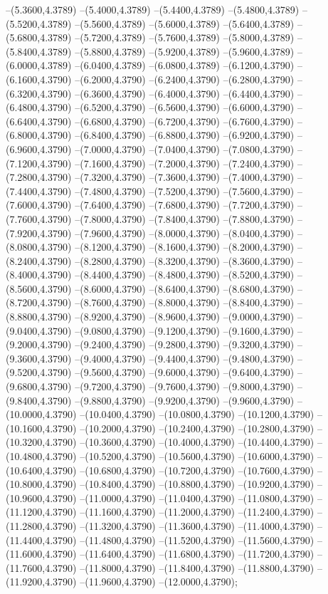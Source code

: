 {	--(5.3600,4.3789)
	--(5.4000,4.3789)
	--(5.4400,4.3789)
	--(5.4800,4.3789)
	--(5.5200,4.3789)
	--(5.5600,4.3789)
	--(5.6000,4.3789)
	--(5.6400,4.3789)
	--(5.6800,4.3789)
	--(5.7200,4.3789)
	--(5.7600,4.3789)
	--(5.8000,4.3789)
	--(5.8400,4.3789)
	--(5.8800,4.3789)
	--(5.9200,4.3789)
	--(5.9600,4.3789)
	--(6.0000,4.3789)
	--(6.0400,4.3789)
	--(6.0800,4.3789)
	--(6.1200,4.3790)
	--(6.1600,4.3790)
	--(6.2000,4.3790)
	--(6.2400,4.3790)
	--(6.2800,4.3790)
	--(6.3200,4.3790)
	--(6.3600,4.3790)
	--(6.4000,4.3790)
	--(6.4400,4.3790)
	--(6.4800,4.3790)
	--(6.5200,4.3790)
	--(6.5600,4.3790)
	--(6.6000,4.3790)
	--(6.6400,4.3790)
	--(6.6800,4.3790)
	--(6.7200,4.3790)
	--(6.7600,4.3790)
	--(6.8000,4.3790)
	--(6.8400,4.3790)
	--(6.8800,4.3790)
	--(6.9200,4.3790)
	--(6.9600,4.3790)
	--(7.0000,4.3790)
	--(7.0400,4.3790)
	--(7.0800,4.3790)
	--(7.1200,4.3790)
	--(7.1600,4.3790)
	--(7.2000,4.3790)
	--(7.2400,4.3790)
	--(7.2800,4.3790)
	--(7.3200,4.3790)
	--(7.3600,4.3790)
	--(7.4000,4.3790)
	--(7.4400,4.3790)
	--(7.4800,4.3790)
	--(7.5200,4.3790)
	--(7.5600,4.3790)
	--(7.6000,4.3790)
	--(7.6400,4.3790)
	--(7.6800,4.3790)
	--(7.7200,4.3790)
	--(7.7600,4.3790)
	--(7.8000,4.3790)
	--(7.8400,4.3790)
	--(7.8800,4.3790)
	--(7.9200,4.3790)
	--(7.9600,4.3790)
	--(8.0000,4.3790)
	--(8.0400,4.3790)
	--(8.0800,4.3790)
	--(8.1200,4.3790)
	--(8.1600,4.3790)
	--(8.2000,4.3790)
	--(8.2400,4.3790)
	--(8.2800,4.3790)
	--(8.3200,4.3790)
	--(8.3600,4.3790)
	--(8.4000,4.3790)
	--(8.4400,4.3790)
	--(8.4800,4.3790)
	--(8.5200,4.3790)
	--(8.5600,4.3790)
	--(8.6000,4.3790)
	--(8.6400,4.3790)
	--(8.6800,4.3790)
	--(8.7200,4.3790)
	--(8.7600,4.3790)
	--(8.8000,4.3790)
	--(8.8400,4.3790)
	--(8.8800,4.3790)
	--(8.9200,4.3790)
	--(8.9600,4.3790)
	--(9.0000,4.3790)
	--(9.0400,4.3790)
	--(9.0800,4.3790)
	--(9.1200,4.3790)
	--(9.1600,4.3790)
	--(9.2000,4.3790)
	--(9.2400,4.3790)
	--(9.2800,4.3790)
	--(9.3200,4.3790)
	--(9.3600,4.3790)
	--(9.4000,4.3790)
	--(9.4400,4.3790)
	--(9.4800,4.3790)
	--(9.5200,4.3790)
	--(9.5600,4.3790)
	--(9.6000,4.3790)
	--(9.6400,4.3790)
	--(9.6800,4.3790)
	--(9.7200,4.3790)
	--(9.7600,4.3790)
	--(9.8000,4.3790)
	--(9.8400,4.3790)
	--(9.8800,4.3790)
	--(9.9200,4.3790)
	--(9.9600,4.3790)
	--(10.0000,4.3790)
	--(10.0400,4.3790)
	--(10.0800,4.3790)
	--(10.1200,4.3790)
	--(10.1600,4.3790)
	--(10.2000,4.3790)
	--(10.2400,4.3790)
	--(10.2800,4.3790)
	--(10.3200,4.3790)
	--(10.3600,4.3790)
	--(10.4000,4.3790)
	--(10.4400,4.3790)
	--(10.4800,4.3790)
	--(10.5200,4.3790)
	--(10.5600,4.3790)
	--(10.6000,4.3790)
	--(10.6400,4.3790)
	--(10.6800,4.3790)
	--(10.7200,4.3790)
	--(10.7600,4.3790)
	--(10.8000,4.3790)
	--(10.8400,4.3790)
	--(10.8800,4.3790)
	--(10.9200,4.3790)
	--(10.9600,4.3790)
	--(11.0000,4.3790)
	--(11.0400,4.3790)
	--(11.0800,4.3790)
	--(11.1200,4.3790)
	--(11.1600,4.3790)
	--(11.2000,4.3790)
	--(11.2400,4.3790)
	--(11.2800,4.3790)
	--(11.3200,4.3790)
	--(11.3600,4.3790)
	--(11.4000,4.3790)
	--(11.4400,4.3790)
	--(11.4800,4.3790)
	--(11.5200,4.3790)
	--(11.5600,4.3790)
	--(11.6000,4.3790)
	--(11.6400,4.3790)
	--(11.6800,4.3790)
	--(11.7200,4.3790)
	--(11.7600,4.3790)
	--(11.8000,4.3790)
	--(11.8400,4.3790)
	--(11.8800,4.3790)
	--(11.9200,4.3790)
	--(11.9600,4.3790)
	--(12.0000,4.3790);
}
